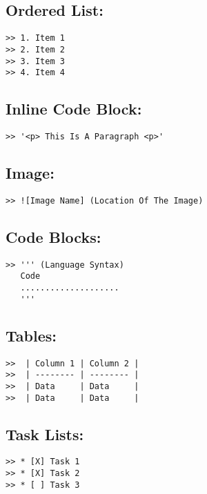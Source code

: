 \documentclass[british]{article}
\begin{document}
\subsection{Ordered List:}
\begin{verbatim}
>> 1. Item 1
>> 2. Item 2
>> 3. Item 3
>> 4. Item 4
\end{verbatim}

\subsection{Inline Code Block:}
\begin{verbatim}
>> '<p> This Is A Paragraph <p>'
\end{verbatim}

\subsection{Image:}
\begin{verbatim}
>> ![Image Name] (Location Of The Image)
\end{verbatim}

\subsection{Code Blocks:}
\begin{verbatim}
>> ''' (Language Syntax)
   Code 
   ....................
   '''
\end{verbatim}

\subsection{Tables:}
\begin{verbatim}
>>  | Column 1 | Column 2 |
>>  | -------- | -------- |
>>  | Data     | Data     |
>>  | Data     | Data     |
\end{verbatim}

\subsection{Task Lists:}
\begin{verbatim}
>> * [X] Task 1
>> * [X] Task 2
>> * [ ] Task 3
\end{verbatim}
\end{document}
